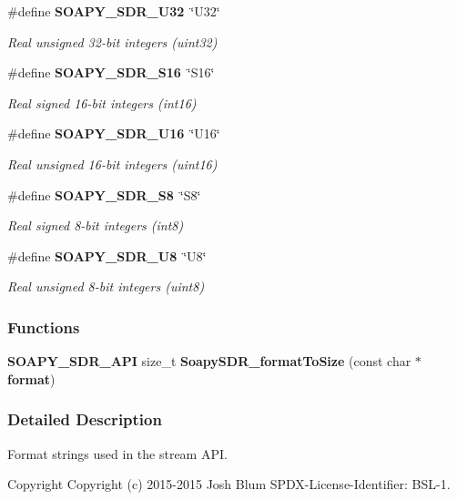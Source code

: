 \begin{DoxyCompactItemize}
\#define {\bf S\+O\+A\+P\+Y\+\_\+\+S\+D\+R\+\_\+\+U32}~\char`\"{}U32\char`\"{}
\begin{DoxyCompactList}\small\item\em Real unsigned 32-\/bit integers (uint32) \end{DoxyCompactList}\item 
\#define {\bf S\+O\+A\+P\+Y\+\_\+\+S\+D\+R\+\_\+\+S16}~\char`\"{}S16\char`\"{}
\begin{DoxyCompactList}\small\item\em Real signed 16-\/bit integers (int16) \end{DoxyCompactList}\item 
\#define {\bf S\+O\+A\+P\+Y\+\_\+\+S\+D\+R\+\_\+\+U16}~\char`\"{}U16\char`\"{}
\begin{DoxyCompactList}\small\item\em Real unsigned 16-\/bit integers (uint16) \end{DoxyCompactList}\item 
\#define {\bf S\+O\+A\+P\+Y\+\_\+\+S\+D\+R\+\_\+\+S8}~\char`\"{}S8\char`\"{}
\begin{DoxyCompactList}\small\item\em Real signed 8-\/bit integers (int8) \end{DoxyCompactList}\item 
\#define {\bf S\+O\+A\+P\+Y\+\_\+\+S\+D\+R\+\_\+\+U8}~\char`\"{}U8\char`\"{}
\begin{DoxyCompactList}\small\item\em Real unsigned 8-\/bit integers (uint8) \end{DoxyCompactList}\end{DoxyCompactItemize}
\subsubsection*{Functions}
\begin{DoxyCompactItemize}
\item 
{\bf S\+O\+A\+P\+Y\+\_\+\+S\+D\+R\+\_\+\+A\+PI} size\+\_\+t {\bf Soapy\+S\+D\+R\+\_\+format\+To\+Size} (const char $\ast${\bf format})
\end{DoxyCompactItemize}


\subsubsection{Detailed Description}
Format strings used in the stream A\+PI. 

\begin{DoxyCopyright}{Copyright}
Copyright (c) 2015-\/2015 Josh Blum S\+P\+D\+X-\/\+License-\/\+Identifier\+: B\+S\+L-\/1. 
\end{DoxyCopyright}


